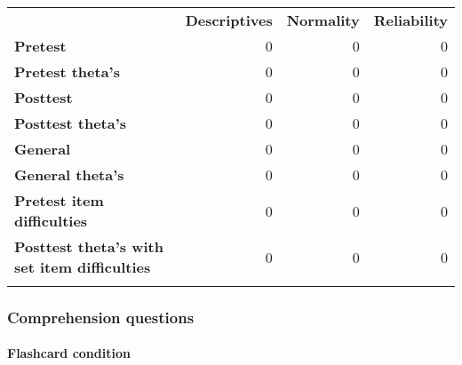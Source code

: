 \begin{longtable}[c]{@{}lrrr@{}}
\toprule\addlinespace
& \textbf{Descriptives} & \textbf{Normality} & \textbf{Reliability}
\\\addlinespace
\midrule\endhead
\textbf{Pretest} & 0 & 0 & 0
\\\addlinespace
\textbf{Pretest theta's} & 0 & 0 & 0
\\\addlinespace
\textbf{Posttest} & 0 & 0 & 0
\\\addlinespace
\textbf{Posttest theta's} & 0 & 0 & 0
\\\addlinespace
\textbf{General} & 0 & 0 & 0
\\\addlinespace
\textbf{General theta's} & 0 & 0 & 0
\\\addlinespace
\textbf{Pretest item difficulties} & 0 & 0 & 0
\\\addlinespace
\textbf{Posttest theta's with set item difficulties} & 0 & 0 & 0
\\\addlinespace
\bottomrule
\end{longtable}

\subsubsection{Comprehension questions}\label{comprehension-questions}

\paragraph{Flashcard condition}\label{flashcard-condition-1}

